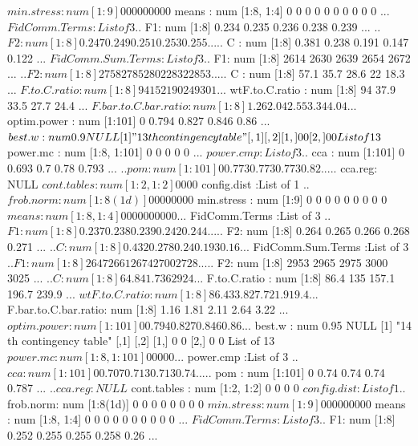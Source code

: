 \documentclass[11pt]{article} %
\begin{document}
\begin{Schunk}
\begin{Soutput}
 $ min.stress          : num [1:9] 0 0 0 0 0 0 0 0 0
 $ means               : num [1:8, 1:4] 0 0 0 0 0 0 0 0 0 0 ...
 $ FidComm.Terms       :List of 3
  ..$ F1: num [1:8] 0.234 0.235 0.236 0.238 0.239 ...
  ..$ F2: num [1:8] 0.247 0.249 0.251 0.253 0.255 ...
  ..$ C : num [1:8] 0.381 0.238 0.191 0.147 0.122 ...
 $ FidComm.Sum.Terms   :List of 3
  ..$ F1: num [1:8] 2614 2630 2639 2654 2672 ...
  ..$ F2: num [1:8] 2758 2785 2802 2832 2853 ...
  ..$ C : num [1:8] 57.1 35.7 28.6 22 18.3 ...
 $ F.to.C.ratio        : num [1:8] 94 152 190 249 301 ...
 $ wtF.to.C.ratio      : num [1:8] 94 37.9 33.5 27.7 24.4 ...
 $ F.bar.to.C.bar.ratio: num [1:8] 1.26 2.04 2.55 3.34 4.04 ...
 $ optim.power         : num [1:101] 0 0.794 0.827 0.846 0.86 ...
 $ best.w              : num 0.9
NULL
[1] "13 th contingency table"
     [,1] [,2]
[1,]    0    0
[2,]    0    0
List of 13
 $ power.mc            : num [1:8, 1:101] 0 0 0 0 0 ...
 $ power.cmp           :List of 3
  ..$ cca    : num [1:101] 0 0.693 0.7 0.78 0.793 ...
  ..$ pom    : num [1:101] 0 0.773 0.773 0.773 0.82 ...
  ..$ cca.reg: NULL
 $ cont.tables         : num [1:2, 1:2] 0 0 0 0
 $ config.dist         :List of 1
  ..$ frob.norm: num [1:8(1d)] 0 0 0 0 0 0 0 0
 $ min.stress          : num [1:9] 0 0 0 0 0 0 0 0 0
 $ means               : num [1:8, 1:4] 0 0 0 0 0 0 0 0 0 0 ...
 $ FidComm.Terms       :List of 3
  ..$ F1: num [1:8] 0.237 0.238 0.239 0.242 0.244 ...
  ..$ F2: num [1:8] 0.264 0.265 0.266 0.268 0.271 ...
  ..$ C : num [1:8] 0.432 0.278 0.24 0.193 0.16 ...
 $ FidComm.Sum.Terms   :List of 3
  ..$ F1: num [1:8] 2647 2661 2674 2700 2728 ...
  ..$ F2: num [1:8] 2953 2965 2975 3000 3025 ...
  ..$ C : num [1:8] 64.8 41.7 36 29 24 ...
 $ F.to.C.ratio        : num [1:8] 86.4 135 157.1 196.7 239.9 ...
 $ wtF.to.C.ratio      : num [1:8] 86.4 33.8 27.7 21.9 19.4 ...
 $ F.bar.to.C.bar.ratio: num [1:8] 1.16 1.81 2.11 2.64 3.22 ...
 $ optim.power         : num [1:101] 0 0.794 0.827 0.846 0.86 ...
 $ best.w              : num 0.95
NULL
[1] "14 th contingency table"
     [,1] [,2]
[1,]    0    0
[2,]    0    0
List of 13
 $ power.mc            : num [1:8, 1:101] 0 0 0 0 0 ...
 $ power.cmp           :List of 3
  ..$ cca    : num [1:101] 0 0.707 0.713 0.713 0.74 ...
  ..$ pom    : num [1:101] 0 0.74 0.74 0.74 0.787 ...
  ..$ cca.reg: NULL
 $ cont.tables         : num [1:2, 1:2] 0 0 0 0
 $ config.dist         :List of 1
  ..$ frob.norm: num [1:8(1d)] 0 0 0 0 0 0 0 0
 $ min.stress          : num [1:9] 0 0 0 0 0 0 0 0 0
 $ means               : num [1:8, 1:4] 0 0 0 0 0 0 0 0 0 0 ...
 $ FidComm.Terms       :List of 3
  ..$ F1: num [1:8] 0.252 0.255 0.255 0.258 0.26 ...

\end{Soutput}
\end{Schunk}
\end{document}
